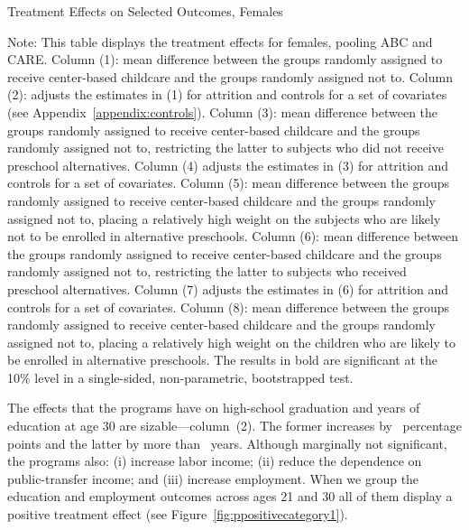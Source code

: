 \begin{table}[H] 
\begin{threeparttable}
\caption{Treatment Effects on Selected Outcomes, Females}
\label{table:females}
\centering
\scalebox{.97}{
}
\begin{tablenotes}
\footnotesize
\item Note: This table displays the treatment effects for females, pooling ABC and CARE. Column (1): mean difference between the groups randomly assigned to receive center-based childcare and the groups randomly assigned not to. Column (2): adjusts the estimates in (1) for attrition and controls for a set of covariates (see Appendix~\ref{appendix:controls}). Column (3): mean difference between the groups randomly assigned to receive center-based childcare and the groups randomly assigned not to, restricting the latter to subjects who did not receive preschool alternatives. Column (4) adjusts the estimates in (3) for attrition and controls for a set of covariates. Column (5): mean difference between the groups randomly assigned to receive center-based childcare and the groups randomly assigned not to, placing a relatively high weight on the subjects who are likely not to be enrolled in alternative preschools. Column (6): mean difference between the groups randomly assigned to receive center-based childcare and the groups randomly assigned not to, restricting the latter to subjects who received preschool alternatives. Column (7) adjusts the estimates in (6) for attrition and controls for a set of covariates. Column (8): mean difference between the groups randomly assigned to receive center-based childcare and the groups randomly assigned not to, placing a relatively high weight on the children who are likely to be enrolled in alternative preschools. The results in bold are significant at the 10\% level in a single-sided, non-parametric, bootstrapped test.
\end{tablenotes}
\end{threeparttable}
\end{table}

\noindent The effects that the programs have on high-school graduation and years of education at age 30 are sizable---column~(2). The former increases by \hsgradf\ percentage points and the latter by more than \yearsedf\ years. Although marginally not significant, the programs also: (i) increase labor income; (ii) reduce the dependence on public-transfer income; and (iii) increase employment. When we group the education and employment outcomes across ages 21 and 30 all of them display a positive treatment effect (see Figure~\ref{fig:ppositivecategory1}).\\

